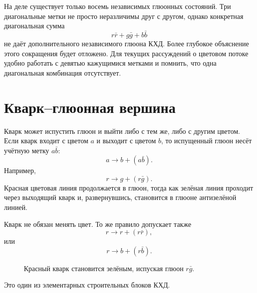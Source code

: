 На деле существует только восемь независимых глюонных состояний. Три диагональные метки не просто неразличимы друг с другом, однако конкретная диагональная сумма
\begin{equation}
r\bar r+g\bar g+b\bar b
\end{equation}
не даёт дополнительного независимого глюона КХД. Более глубокое объяснение этого сокращения будет отложено. Для текущих рассуждений о цветовом потоке удобно работать с девятью кажущимися метками и помнить, что одна диагональная комбинация отсутствует.

\section{Кварк--глюонная вершина}

Кварк может испустить глюон и выйти либо с тем же, либо с другим цветом. Если кварк входит с цветом \(a\) и выходит с цветом \(b\), то испущенный глюон несёт учётную метку \(a\bar b\):
\begin{equation}
a\longrightarrow b+(a\bar b).
\end{equation}
Например,
\begin{equation}
r\longrightarrow g+(r\bar g).
\end{equation}
Красная цветовая линия продолжается в глюон, тогда как зелёная линия проходит через выходящий кварк и, развернувшись, становится в глюоне антизелёной линией.

Кварк не обязан менять цвет. То же правило допускает также
\begin{equation}
r\longrightarrow r+(r\bar r),
\end{equation}
или
\begin{equation}
r\longrightarrow b+(r\bar b).
\end{equation}

\begin{figure}[h]
\centering
{}
\caption{Красный кварк становится зелёным, испуская глюон \(r\bar g\).}
\end{figure}

Это один из элементарных строительных блоков КХД.

